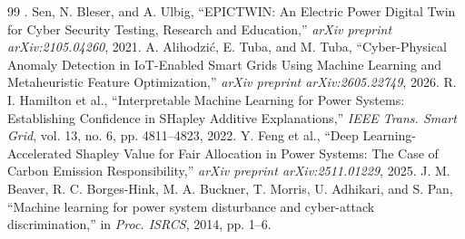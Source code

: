 \documentclass[conference]{IEEEtran}
\begin{document}
\begin{thebibliography}{99}
 . Sen, N. Bleser, and A. Ulbig, ``EPICTWIN: An Electric Power Digital Twin for Cyber Security Testing, Research and Education,'' \textit{arXiv preprint arXiv:2105.04260}, 2021.
 A. Alihodzi\'{c}, E. Tuba, and M. Tuba, ``Cyber-Physical Anomaly Detection in IoT-Enabled Smart Grids Using Machine Learning and Metaheuristic Feature Optimization,'' \textit{arXiv preprint arXiv:2605.22749}, 2026.
 R. I. Hamilton et al., ``Interpretable Machine Learning for Power Systems: Establishing Confidence in SHapley Additive Explanations,'' \textit{IEEE Trans. Smart Grid}, vol. 13, no. 6, pp. 4811--4823, 2022.
 Y. Feng et al., ``Deep Learning-Accelerated Shapley Value for Fair Allocation in Power Systems: The Case of Carbon Emission Responsibility,'' \textit{arXiv preprint arXiv:2511.01229}, 2025.
 J. M. Beaver, R. C. Borges-Hink, M. A. Buckner, T. Morris, U. Adhikari, and S. Pan, ``Machine learning for power system disturbance and cyber-attack discrimination,'' in \textit{Proc. ISRCS}, 2014, pp. 1--6.
\end{thebibliography}
\end{document}
